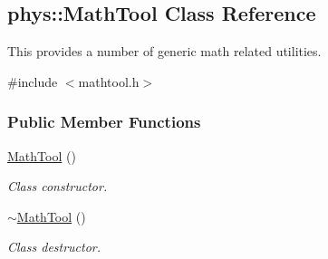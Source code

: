 \hypertarget{classphys_1_1MathTool}{
\subsection{phys::MathTool Class Reference}
\label{d6/df1/classphys_1_1MathTool}
}


This provides a number of generic math related utilities.  




{\ttfamily \#include $<$mathtool.h$>$}

\subsubsection*{Public Member Functions}
\begin{DoxyCompactItemize}
\item 
\hypertarget{classphys_1_1MathTool_af84aa9b6559d4fb8b23a9d308ceb80e6}{
\hyperlink{classphys_1_1MathTool_af84aa9b6559d4fb8b23a9d308ceb80e6}{MathTool} ()}
\label{d6/df1/classphys_1_1MathTool_af84aa9b6559d4fb8b23a9d308ceb80e6}

\begin{DoxyCompactList}\small\item\em Class constructor. \item\end{DoxyCompactList}\item 
\hypertarget{classphys_1_1MathTool_a052abf23a87a799b0233506bb685a72f}{
\hyperlink{classphys_1_1MathTool_a052abf23a87a799b0233506bb685a72f}{$\sim$MathTool} ()}
\label{d6/df1/classphys_1_1MathTool_a052abf23a87a799b0233506bb685a72f}

\begin{DoxyCompactList}\small\item\em Class destructor. \item\end{DoxyCompactList}\end{DoxyCompactItemize}
